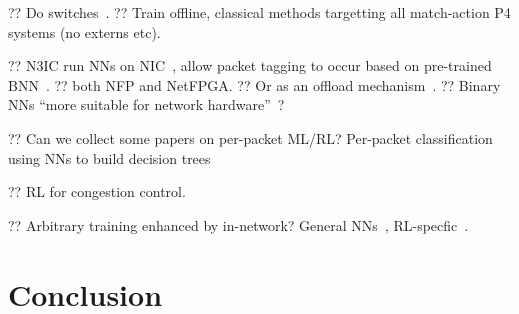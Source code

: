 \documentclass[sigconf,natbib=false]{acmart}
\begin{document}
?? Do switches~\parencite{DBLP:conf/hotnets/XiongZ19}.
?? Train offline, classical methods targetting all match-action P4 systems (no externs etc).

?? N3IC run NNs on NIC~\parencite{DBLP:journals/corr/abs-2009-02353}, allow packet tagging to occur based on pre-trained BNN~\parencite{DBLP:conf/nips/HubaraCSEB16}.
?? both NFP and NetFPGA.
?? Or as an offload mechanism~\parencite{DBLP:conf/sigcomm/SanvitoSB18,DBLP:journals/corr/abs-1801-05731}.
?? Binary NNs ``more suitable for network hardware''~\parencite{DBLP:journals/corr/MiyashitaLM16}?

?? Can we collect some papers on per-packet ML/RL? Per-packet classification using NNs to build decision trees~\parencite{DBLP:conf/sigcomm/LiangZJS19}

?? RL for congestion control. ~\parencite{DBLP:journals/corr/abs-1910-04054}

?? Arbitrary training enhanced by in-network? General NNs~\parencite{DBLP:conf/micro/LiPAYQPWSEK18}, RL-specfic~\parencite{DBLP:conf/isca/LiLYCSH19}.

\section{Conclusion}
	
%
%
\printbibliography
	
\end{document}
